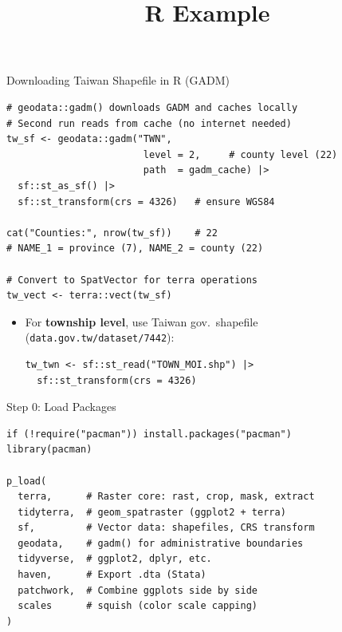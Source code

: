 \documentclass[dvipsnames,hyperref={pdfpagelabels=false}]{beamer}
\begin{document}
\begin{frame}[fragile]{Downloading Taiwan Shapefile in R (GADM)}
\begin{lstlisting}
# geodata::gadm() downloads GADM and caches locally
# Second run reads from cache (no internet needed)
tw_sf <- geodata::gadm("TWN",
                        level = 2,     # county level (22)
                        path  = gadm_cache) |>
  sf::st_as_sf() |>
  sf::st_transform(crs = 4326)   # ensure WGS84

cat("Counties:", nrow(tw_sf))    # 22
# NAME_1 = province (7), NAME_2 = county (22)

# Convert to SpatVector for terra operations
tw_vect <- terra::vect(tw_sf)
\end{lstlisting}
\vspace{0.1cm}
\begin{itemize}
  \item For \textbf{township level}, use Taiwan gov.\ shapefile
        (\texttt{data.gov.tw/dataset/7442}):
  \vspace{0.1cm}
\begin{lstlisting}
tw_twn <- sf::st_read("TOWN_MOI.shp") |>
  sf::st_transform(crs = 4326)
\end{lstlisting}
\end{itemize}
\end{frame}


\title[]{R Example}
\author{}
\institute{}
\date{}
\begin{frame}{}
  \titlepage
\end{frame}


\begin{frame}[fragile]{Step 0: Load Packages}
\begin{lstlisting}
if (!require("pacman")) install.packages("pacman")
library(pacman)

p_load(
  terra,      # Raster core: rast, crop, mask, extract
  tidyterra,  # geom_spatraster (ggplot2 + terra)
  sf,         # Vector data: shapefiles, CRS transform
  geodata,    # gadm() for administrative boundaries
  tidyverse,  # ggplot2, dplyr, etc.
  haven,      # Export .dta (Stata)
  patchwork,  # Combine ggplots side by side
  scales      # squish (color scale capping)
)
\end{lstlisting}
\end{frame}
\end{document}
